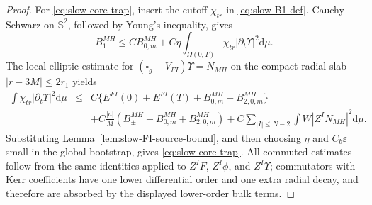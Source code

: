 \documentclass[10pt,a4paper]{amsart}
\newcommand{\dd}{\mathrm{d}}
\begin{document}
\begin{proof}
For \eqref{eq:slow-core-trap}, insert the cutoff \(\chi_{tr}\) in \eqref{eq:slow-B1-def}.  Cauchy-Schwarz on \(\mathbb S^2\), followed by Young's inequality, gives
\begin{equation}
B_1^{MH}\le C B_{0,m}^{MH}
+C\eta\int_{\Omega(0,T)}\chi_{tr}|\partial_t\Upsilon|^2\dd\mu.
\end{equation}
The local elliptic estimate for \((\square_g-V_{FI})\Upsilon=N_{MH}\) on the compact radial slab \(|r-3M|\le2r_1\) yields
\begin{eqnarray}
\int\chi_{tr}|\partial_t\Upsilon|^2\dd\mu
&\le&
C\{E^{FI}(0)+E^{FI}(T)+B_{0,m}^{MH}+B_{2,0,m}^{MH}\}
\nonumber\\
&&+C\frac{|a|}{M}(B_{\pm}^{MH}+B_{0,m}^{MH}+B_{2,0,m}^{MH})
+C\sum_{|I|\le N-2}\int W|Z^IN_{MH}|^2\dd\mu.
\end{eqnarray}
Substituting Lemma~\ref{lem:slow-FI-source-bound}, and then choosing \(\eta\) and \(C_b\varepsilon\) small in the global bootstrap, gives \eqref{eq:slow-core-trap}.  All commuted estimates follow from the same identities applied to \(Z^IF\), \(Z^I\phi\), and \(Z^I\Upsilon\); commutators with Kerr coefficients have one lower differential order and one extra radial decay, and therefore are absorbed by the displayed lower-order bulk terms.
\end{proof}
\end{document}
